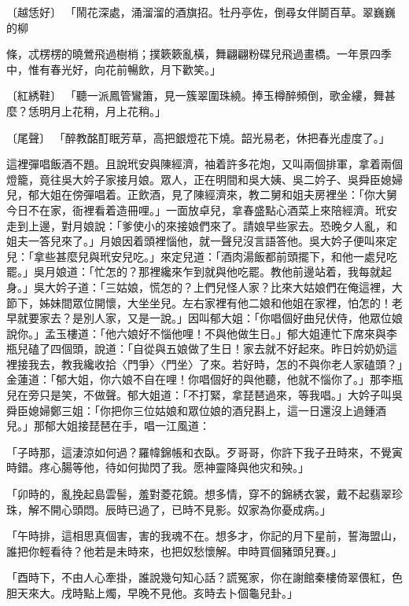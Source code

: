 \begin{showcontents}{}
〔越恁好〕  「鬧花深處，涌溜溜的酒旗招。牡丹亭佐，倒尋女伴鬬百草。翠巍巍的柳

條，忒楞楞的曉鶯飛過樹梢；撲簌簌亂橫，舞翩翩粉碟兒飛過畫橋。一年景四季中，惟有春光好，向花前暢飲，月下歡笑。」

〔紅綉鞋〕  「聽一派鳳管鸞簫，見一簇翠圍珠繞。捧玉樽醉頻倒，歌金縷，舞甚麼？恁明月上花稍，月上花稍。」

〔尾聲〕  「醉教酩酊眠芳草，高把銀燈花下燒。韶光易老，休把春光虛度了。」

這裡彈唱飯酒不題。且說玳安與陳經濟，袖着許多花炮，又叫兩個排軍，拿着兩個燈籠，竟往吳大妗子家接月娘。眾人，正在明間和吳大姨、吳二妗子、吳舜臣媳婦兒，郁大姐在傍彈唱着。正飲酒，見了陳經濟來，教二舅和姐夫房裡坐：「你大舅今日不在家，衙裡看着造冊哩。」一面放卓兒，拿春盛點心酒菜上來陪經濟。玳安走到上邊，對月娘說：「爹使小的來接娘們來了。請娘早些家去。恐晚夕人亂，和姐夫一答兒來了。」月娘因着頭裡惱他，就一聲兒沒言語答他。吳大妗子便叫來定兒：「拿些甚麼兒與玳安兒吃。」來定兒道：「酒肉湯飯都前頭擺下，和他一處兒吃罷。」吳月娘道：「忙怎的？那裡纔來乍到就與他吃罷。教他前邊站着，我每就起身。」吳大妗子道：「三姑娘，慌怎的？上們兒怪人家？比來大姑娘們在俺這裡，大節下，姊妹間眾位開懷，大坐坐兒。左右家裡有他二娘和他姐在家裡，怕怎的！老早就要家去？是別人家，又是一說。」因叫郁大姐：「你唱個好曲兒伏侍，他眾位娘說你。」孟玉樓道：「他六娘好不惱他哩！不與他做生日。」郁大姐連忙下席來與李瓶兒磕了四個頭，說道：「自從與五娘做了生日！家去就不好起來。昨日妗奶奶這裡接我去，教我纔收拾〈門爭〉〈門坐〉了來。若好時，怎的不與你老人家磕頭？」金蓮道：「郁大姐，你六娘不自在哩！你唱個好的與他聽，他就不惱你了。」那李瓶兒在旁只是笑，不做聲。郁大姐道：「不打緊，拿琵琶過來，等我唱。」大妗子叫吳舜臣媳婦鄭三姐：「你把你三位姑娘和眾位娘的酒兒斟上，這一日還沒上過鍾酒兒。」那郁大姐接琵琶在手，唱一江風道：

「子時那，這淒涼如何過？羅幃錦帳和衣臥。歹哥哥，你許下我子丑時來，不覺寅時錯。疼心腸等他，待如何拋閃了我。愿神靈降與他灾和殃。」

「卯時的，亂挽起島雲髻，羞對菱花鏡。想多情，穿不的錦綉衣裳，戴不起翡翠珍珠，解不開心頭悶。辰時已過了，已時不見影。奴家為你憂成病。」

「午時排，這相思真個害，害的我魂不在。想多才，你記的月下星前，誓海盟山，誰把你輕看待？他若是未時來，也把奴愁懷解。申時買個豬頭兒賽。」

「酉時下，不由人心牽掛，誰說幾句知心話？謊冤家，你在謝館秦樓倚翠偎紅，色胆天來大。戌時點上燭，早晚不見他。亥時去卜個龜兒卦。」


\end{showcontents}
